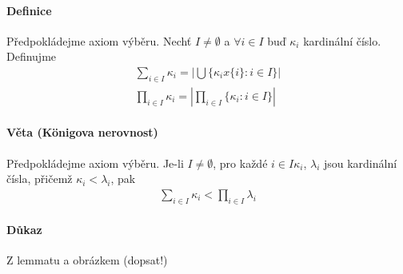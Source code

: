 \documentclass[a4paper,12pt,titlepage]{article}
\begin{document}
\paragraph{Definice}
Předpokládejme axiom výběru. Nechť $I \neq \emptyset$ a $\forall i \in I$ buď
$\kappa_i$ kardinální číslo. Definujme 
\begin{align}
	\sum_{i\in I} \kappa_i = \left| \bigcup \{\kappa_i x \{i\}: i \in I
	\}\right| \\
	\prod_{i\in I} \kappa_i = \left| \prod_{i \in I} \{\kappa_i: i \in I\} \right |
\end{align}
\paragraph{Věta (Königova nerovnost)}
Předpokládejme axiom výběru. Je-li $I \neq \emptyset$, pro každé $i \in I
\kappa_i$, $\lambda_i$ jsou kardinální čísla, přičemž $\kappa_i <\lambda_i$, pak 
\begin{align}
	\sum_{i\in I} \kappa_i < \prod_{i\in I} \lambda_i
\end{align}
\paragraph{Důkaz}
Z lemmatu a obrázkem (dopsat!)
\end{document}
